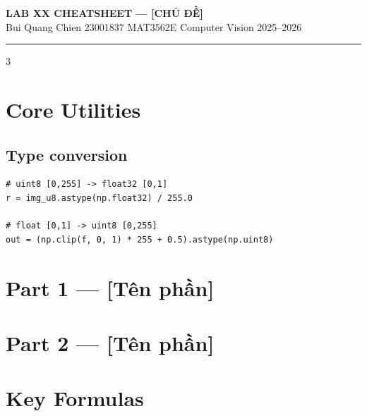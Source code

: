 \documentclass[9pt,a4paper,landscape]{extarticle}
\begin{document}
\begin{center}
  {\large\bfseries\color{hdr} LAB XX CHEATSHEET --- [CHỦ ĐỀ]} \\
  {\small Bui Quang Chien \textbullet{} 23001837 \textbullet{} MAT3562E Computer Vision 2025--2026}
\end{center}
\hrule\vspace{2pt}

\begin{multicols}{3}

\section{Core Utilities}

\subsection{Type conversion}
\begin{lstlisting}
# uint8 [0,255] -> float32 [0,1]
r = img_u8.astype(np.float32) / 255.0

# float [0,1] -> uint8 [0,255]
out = (np.clip(f, 0, 1) * 255 + 0.5).astype(np.uint8)
\end{lstlisting}

\section{Part 1 --- [Tên phần]}


\section{Part 2 --- [Tên phần]}


\section{Key Formulas}


\end{multicols}
\end{document}

